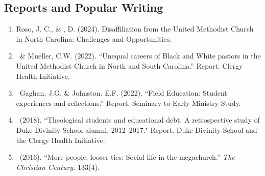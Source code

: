 \subsection*{Reports and Popular Writing}
\begin{enumerate} 
\item Roso, J. C., \& \Eagle, D. (2024). Disaffiliation from the United Methodist Church in North Carolina: Challenges and Opportunities. 

\item \Eagle\, \& Mueller, C.W. (2022). ``Unequal careers of Black and White pastors in the United Methodist Church in North and South Carolina.'' Report. Clergy Health Initiative.

\item \Eagle\, Gaghan, J.G. \& Johnston. E.F. (2022). ``Field Education: Student experiences and reflections.'' Report. Seminary to Early Ministry Study.

\item \Eagle\ (2018). ``Theological students and educational debt: A retrospective study of Duke Divinity School alumni, 2012--2017." Report. Duke Divinity School and the Clergy Health Initiative.

\item \Eagle\ (2016). ``More people, looser ties: Social life in the megachurch.'' \emph{The Christian Century.} 133(4).
\end{enumerate}